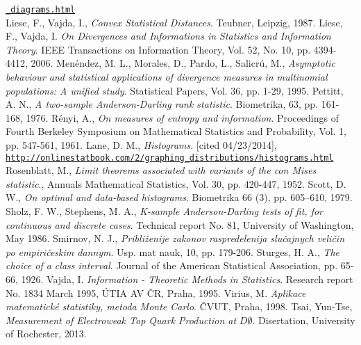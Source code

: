 \begin{thebibliography}{10}
\href{http://www-d0.fnal.gov/Run2Physics/top/top_public_web_pages/top_feynman_diagrams.html}{\texttt{\_diagrams.html}}\\
Liese, F., Vajda, I., {\em Convex Statistical Distances}. Teubner, Leipzig, 1987.
Liese, F., Vajda, I. {\em On Divergences and Informations in Statistics and Information Theory}. IEEE Transactions on Information Theory, Vol. 52, No. 10, pp. 4394-4412, 2006.
 Menéndez, M. L., Morales, D., Pardo, L., Salicrú, M., {\em Asymptotic behaviour and statistical applications of divergence measures in multinomial populations: A unified study}. Statistical Papers, Vol. 36, pp. 1-29, 1995.
Pettitt, A. N., {\em A two-sample Anderson-Darling rank statistic}. Biometrika, 63, pp. 161-168, 1976.
 R\'enyi, A., {\em On measures of entropy and information}. Proceedings of Fourth Berkeley Symposium on Mathematical Statistics and Probability, Vol. 1, pp. 547-561, 1961.
 Lane, D. M., {\em Histograms}. [cited 04/23/2014], \\
\href{http://onlinestatbook.com/2/graphing_distributions/histograms.html}{\texttt{http://onlinestatbook.com/2/graphing\_distributions/histograms.html}}
 Rosenblatt, M., {\em Limit theorems associated with variants of the con Mises statistic}., Annuals Mathematical Statistics, Vol. 30, pp. 420-447, 1952.
 Scott, D. W., {\em On optimal and data-based histograms}. Biometrika 66 (3), pp. 605–610, 1979.
 Sholz, F. W., Stephens, M. A., {\em K-sample Anderson-Darling tests of fit, for continuous and discrete cases}. Technical report No. 81, University of Washington, May 1986.
Smirnov, N. J., {\em Pribli\v{z}enije zakonov raspredelenija slu\v{c}ajnych veli\v{c}in po empiri\v{c}eskim dannym}. Usp. mat nauk, 10, pp. 179-206.
 Sturges, H. A., {\em The choice of a class interval}. Journal of the American Statistical Association, pp. 65-66, 1926.
Vajda, I. {\em Information - Theoretic Methods in Statistics}. Research report No. 1834 March 1995, \'{U}TIA AV \v{C}R, Praha, 1995.
Virius, M. {\em Aplikace matematick\'e statistiky, metoda Monte Carlo}. \v{C}VUT, Praha, 1998.
Tsai, Yun-Tse, {\em Measurement of Electroweak Top Quark Production at} $D\mathit{\emptyset}$. Disertation, University of Rochester, 2013.
\end{thebibliography}